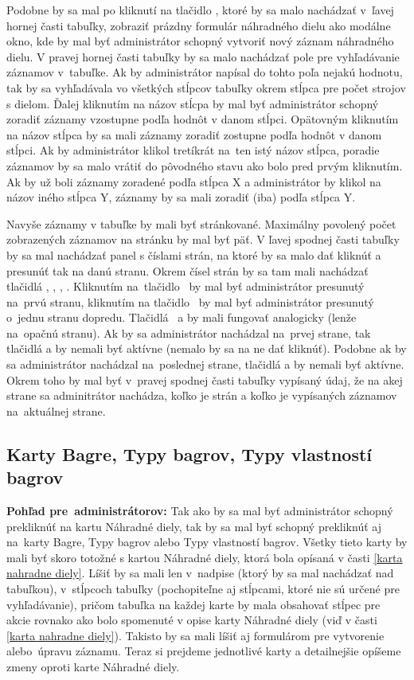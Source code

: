 Podobne by sa mal po kliknutí na tlačidlo , ktoré by sa malo nachádzať v~ľavej hornej časti tabuľky, zobraziť prázdny formulár náhradného dielu ako modálne okno, kde by mal byť administrátor schopný vytvoriť nový záznam náhradného dielu. V pravej hornej časti tabuľky by sa malo nachádzať pole pre vyhľadávanie záznamov v~tabuľke. Ak by administrátor napísal do tohto poľa nejakú hodnotu, tak by sa vyhľadávala vo všetkých stĺpcov tabuľky okrem stĺpca pre počet strojov s dielom. Ďalej kliknutím na názov stĺcpa by mal byť administrátor schopný zoradiť záznamy vzostupne podľa hodnôt v danom stĺpci. Opätovným kliknutím na názov stĺpca by sa mali záznamy zoradiť zostupne podľa hodnôt v danom stĺpci. Ak by administrátor klikol tretíkrát na~ten istý názov stĺpca, poradie záznamov by sa malo vrátiť do pôvodného stavu ako bolo pred prvým kliknutím. Ak by už boli záznamy zoradené podľa stĺpca X a administrátor by klikol na názov iného stĺpca Y, záznamy by sa mali zoradiť (iba) podľa stĺpca Y.

Navyše záznamy v tabuľke by mali byť stránkované. Maximálny povolený počet zobrazených záznamov na stránku by mal byť päť. V ľavej spodnej časti tabuľky by sa mal nachádzať panel s číslami strán, na ktoré by sa malo dať kliknúť a presunúť tak na danú stranu. Okrem čísel strán by sa tam mali nachádzať tlačidlá \uv{<<}, \uv{<}, \uv{>}, \uv{>>}. Kliknutím na~tlačidlo~\uv{<<} by mal byť administrátor presunutý na~prvú stranu, kliknutím na tlačidlo~\uv{<} by mal byť administrátor presunutý o~jednu stranu dopredu. Tlačidlá~\uv{>} a \uv{>>} by mali fungovať analogicky (lenže na~opačnú stranu). Ak by sa administrátor nachádzal na~prvej strane, tak tlačidlá \uv{<<} a \uv{<} by nemali byť aktívne (nemalo by sa na ne dať kliknúť). Podobne ak by sa administrátor nachádzal na~poslednej strane, tlačidlá \uv{>} a \uv{>>} by nemali byť aktívne. Okrem toho by mal byť v~pravej spodnej časti tabuľky vypísaný údaj, že na akej strane sa adminitrátor nachádza, koľko je strán a koľko je vypísaných záznamov na~aktuálnej strane.

\subsection{Karty Bagre, Typy bagrov, Typy vlastností bagrov}
\label{karty bagre typy bagrov typy vlastnosti bagrov}

\textbf{Pohľad pre~administrátorov:} Tak ako by sa mal byť administrátor schopný prekliknúť na kartu Náhradné diely, tak by sa mal byť schopný prekliknúť aj na~karty Bagre, Typy bagrov alebo Typy vlastností bagrov. Všetky tieto karty by mali byť skoro totožné s kartou Náhradné diely, ktorá bola opísaná v časti \ref{karta nahradne diely}. Líšiť by sa mali len v~nadpise (ktorý by sa mal nachádzať nad tabuľkou), v~stĺpcoch tabuľky (pochopiteľne aj stĺpcami, ktoré nie sú určené pre vyhľadávanie), pričom tabuľka na každej karte by mala obsahovať stĺpec pre akcie rovnako ako bolo spomenuté v opise karty Náhradné diely (viď v časti \ref{karta nahradne diely}). Takisto by sa mali líšiť aj formulárom pre vytvorenie alebo~úpravu záznamu. Teraz si prejdeme jednotlivé karty a detailnejšie opíšeme zmeny oproti karte Náhradné diely.

